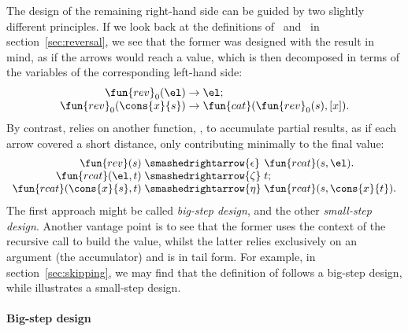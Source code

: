 The design of the remaining right\hyp{}hand
side can be guided by two slightly different principles. If we look
back at the definitions of~
and~ in section~\ref{sec:reversal},
we see that the former was designed with the result in mind, as if the
arrows would reach a value, which is then decomposed in terms of the
variables of the corresponding left\hyp{}hand side:
\begin{equation*}
\begin{array}{r@{\;}l@{\;}l}
\fun{rev}_0(\el) & \rightarrow & \el;\\
\fun{rev}_0(\cons{x}{s}) & \rightarrow &
\fun{cat}(\fun{rev}_0(s),[x]).
\end{array}
\end{equation*}
By contrast,
 relies on another function,
, to accumulate partial results,
as if each arrow covered a short distance, only contributing minimally
to the final value:
\begin{equation*}
\begin{array}{r@{\;}l@{\;}l}
\fun{rev}(s) & \smashedrightarrow{\epsilon} & \fun{rcat}(s,\el).\\
\fun{rcat}(\el,t) & \smashedrightarrow{\zeta} & t;\\
\fun{rcat}(\cons{x}{s},t) & \smashedrightarrow{\eta} &
\fun{rcat}(s,\cons{x}{t}).
\end{array}
\end{equation*}
The first approach might be called \emph{big\hyp{}step
  design}, and the other
\emph{small\hyp{}step design}. Another
vantage point is to see that the former uses the context of the
recursive call to build the value, whilst the latter relies
exclusively on an argument (the accumulator) and is in tail form. For example, in section~\ref{sec:skipping}, we
may find that the definition of 
follows a big\hyp{}step design, while
 illustrates a
small\hyp{}step design.


\paragraph{Big-step design}
\label{big-step}

